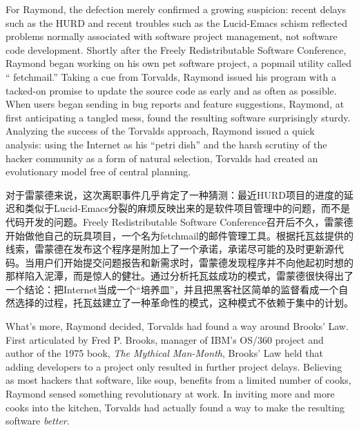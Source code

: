 
\ifdefined\eng
For Raymond, the defection merely confirmed a growing suspicion: recent delays such as the HURD and recent troubles such as the Lucid-Emacs schism reflected problems normally associated with software project management, not software code development. Shortly after the Freely Redistributable Software Conference, Raymond began working on his own pet software project, a popmail utility called `` fetchmail.'' Taking a cue from Torvalds, Raymond issued his program with a tacked-on promise to update the source code as early and as often as possible. When users began sending in bug reports and feature suggestions, Raymond, at first anticipating a tangled mess, found the resulting software surprisingly sturdy. Analyzing the success of the Torvalds approach, Raymond issued a quick analysis: using the Internet as his ``petri dish'' and the harsh scrutiny of the hacker community as a form of natural selection, Torvalds had created an evolutionary model free of central planning.
\fi

\ifdefined\chs
对于雷蒙德来说，这次离职事件几乎肯定了一种猜测：最近HURD项目的进度的延迟和类似于Lucid-Emacs分裂的麻烦反映出来的是软件项目管理中的问题，而不是代码开发的问题。Freely Redistributable Software Conference召开后不久，雷蒙德开始做他自己的玩具项目，一个名为fetchmail的邮件管理工具。根据托瓦兹提供的线索，雷蒙德在发布这个程序是附加上了一个承诺，承诺尽可能的及时更新源代码。当用户们开始提交问题报告和新需求时，雷蒙德发现程序并不向他起初时想的那样陷入泥潭，而是惊人的健壮。通过分析托瓦兹成功的模式，雷蒙德很快得出了一个结论：把Internet当成一个``培养皿''，并且把黑客社区简单的监督看成一个自然选择的过程，托瓦兹建立了一种革命性的模式，这种模式不依赖于集中的计划。
\fi

\ifdefined\eng
What's more, Raymond decided, Torvalds had found a way around Brooks' Law. First articulated by Fred P. Brooks, manager of IBM's OS/360 project and author of the 1975 book, \textit{The Mythical Man-Month}, Brooks' Law held that adding developers to a project only resulted in further project delays. Believing as most hackers that software, like soup, benefits from a limited number of cooks, Raymond sensed something revolutionary at work. In inviting more and more cooks into the kitchen, Torvalds had actually found a way to make the resulting software \textit{better}.
\fi

